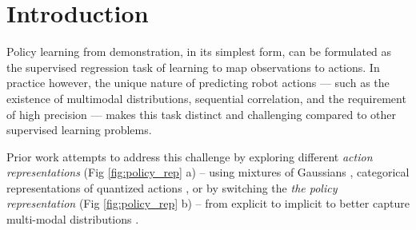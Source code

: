 \documentclass[Afour,sageh,times]{sagej}
\newcommand\todo[1]{\textcolor{red}{[TODO: #1]}}
\begin{document}
\section{Introduction}
Policy learning from demonstration, in its simplest form, can be formulated as the supervised regression task of learning to map observations to actions.
In practice however, the unique nature of predicting robot actions --- such as the existence of multimodal distributions, sequential correlation, and the requirement of high precision ---  makes this task distinct and challenging compared to other supervised learning problems.   


Prior work attempts to address this challenge by exploring different \textit{action representations} (Fig \ref{fig:policy_rep} a) -- using mixtures of Gaussians \cite{robomimic}, categorical representations of quantized actions \cite{bet},
or by switching the \textit{the policy representation} (Fig \ref{fig:policy_rep} b) -- from  explicit to implicit to better capture multi-modal distributions \cite{ibc,wu2020spatial}.
\end{document}
